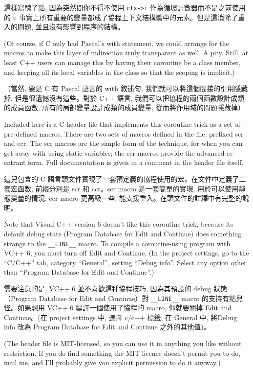\documentclass[12pt]{article}
\begin{document}
\begin{CJK}{UTF8}{bsmi}
這樣寫醜了點, 因為突然間你不得不使用 \verb+ctx->i+ 作為循環計數器而不是之前使用的 i;
事實上所有重要的變量都成了協程上下文結構體中的元素。但是這消除了重入的問題, 並且沒有影響到程序的結構。 

(Of course, if C only had Pascal's with statement, we could arrange for the macros to make this layer of indirection truly transparent as well. A pity. Still, at least C++ users can manage this by having their coroutine be a class member, and keeping all its local variables in the class so that the scoping is implicit.)

（當然, 要是 C 有 Pascal 語言的 with 敘述句, 我們就可以將這個間接的引用隱藏掉, 但是很遺憾沒有這些。對於 C++
語言, 我們可以把協程的兩個函數設計成類的成員函數, 所有的局部變量設計成類的成員變量, 從而將作用域的問題隱藏掉） 

Included here is a C header file that implements this coroutine trick as a set of pre-defined macros. There are two sets of macros defined in the file, prefixed scr and ccr. The scr macros are the simple form of the technique, for when you can get away with using static variables; the ccr macros provide the advanced re-entrant form. Full documentation is given in a comment in the header file itself.

這兒包含的 C 語言頭文件實現了一套預定義的協程使用的宏。在文件中定義了二套宏函數, 前綴分別是 scr 和 ccr。scr macro 是一套簡單的實現, 用於可以使用靜態變量的情況; ccr macro 更高級一些, 能支援重入。在頭文件的註釋中有完整的說明。 

Note that Visual C++ version 6 doesn't like this coroutine trick, because its default debug state (Program Database for Edit and Continue) does something strange to the
\verb+__LINE__+ macro. To compile a coroutine-using program with VC++ 6, you must turn off Edit and Continue. (In the project settings, go to the ``C/C++'' tab, category ``General'', setting ``Debug info''. Select any option other than ``Program Database for Edit and Continue''.)

需要注意的是, VC++ 6 並不喜歡這種協程技巧, 因為其預設的 debug 狀態（Program Database for Edit and Continue）對 \verb+__LINE__+ macro
的支持有點兒怪。如果想用 VC++ 6 編譯一個使用了協程的 macro, 你就要關掉 Edit and Continue。(在 project settings 中, 選擇 c/c++ 標籤,
在 General 中, 將Debug info 改為 Program Database for Edit and Continue 之外的其他值)。 

(The header file is MIT-licensed, so you can use it in anything you like without restriction. If you do find something the MIT licence doesn't permit you to do, mail me, and I'll probably give you explicit permission to do it anyway.)


\end{CJK}
\end{document}
